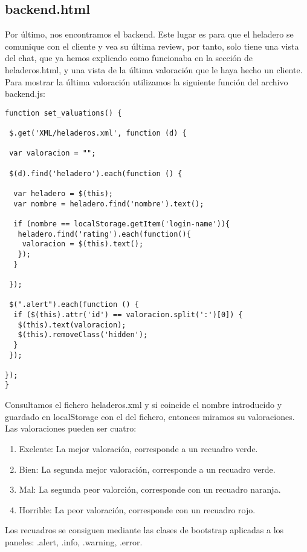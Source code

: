 \documentclass[11pt,a4paper]{article}
\begin{document}
\subsection{backend.html}
Por último, nos encontramos el backend. Este lugar es para que el heladero se comunique con el cliente y vea su última review, por tanto, solo tiene una vista del chat, que ya hemos explicado como funcionaba en la sección de heladeros.html, y una vista de la última valoración que le haya hecho un cliente.\\
Para mostrar la última valoración utilizamos la siguiente función del archivo backend.js:
\begin{lstlisting}
function set_valuations() {

 $.get('XML/heladeros.xml', function (d) {

 var valoracion = "";

 $(d).find('heladero').each(function () {

  var heladero = $(this);
  var nombre = heladero.find('nombre').text();

  if (nombre == localStorage.getItem('login-name')){
   heladero.find('rating').each(function(){
    valoracion = $(this).text();
   });
  }

 });

 $(".alert").each(function () {
  if ($(this).attr('id') == valoracion.split(':')[0]) {
   $(this).text(valoracion);
   $(this).removeClass('hidden');
  }
 });

});
}
\end{lstlisting}

Consultamos el fichero heladeros.xml y si coincide el nombre introducido y guardado en localStorage con el del fichero, entonces miramos su valoraciones.\\
Las valoraciones pueden ser cuatro:
\begin{enumerate}
\item Exelente: La mejor valoración, corresponde a un recuadro verde.
\item Bien: La segunda mejor valoración, corresponde a un recuadro verde.
\item Mal: La segunda peor valorción, corresponde con un recuadro naranja.
\item Horrible: La peor valoración, corresponde con un recuadro rojo.
\end{enumerate}

Los recuadros se consiguen mediante las clases de bootstrap aplicadas a los paneles: .alert, .info, .warning, .error.	\\
\end{document}
